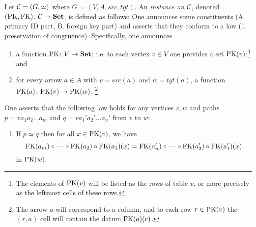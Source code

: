 \documentclass[CT4S-EN-RU]{subfiles}
\begin{document}
\begin{blockRUS}
\end{blockRUS}

\begin{definitionENG}\label{def:instance}
Let $\mathcal{C}=(G,\simeq)$ where $G=(V,A,src,tgt)$. An {\em instance on $\mathcal{C}$}, denoted $(\textnormal{PK},\textnormal{FK})\colon\mathcal{C}\rightarrow{\mathbf{Set}}$, is defined as follows: One announces some constituents (A. primary ID part, B. foreign key part) and asserts that they conform to a law (1. preservation of congruence). Specifically, one announces
\begin{enumerate}[\hsp A.]
\item a function $\textnormal{PK}\colon V\rightarrow {\mathbf{Set}}$; i.e. to each vertex $v\in V$ one provides a set $\textnormal{PK}(v)$;\footnote{The elements of $\textnormal{PK}(v)$ will be listed as the rows of table $v$, or more precisely as the leftmost cells of these rows.} and
\item for every arrow $a\in A$ with $v=src(a)$ and $w=tgt(a)$, a function $\textnormal{FK}(a)\colon\textnormal{PK}(v)\rightarrow\textnormal{PK}(w)$.
\footnote{The arrow $a$ will correspond to a column, and to each row $r\in\textnormal{PK}(v)$ the $(r,a)$ cell will contain the datum $\textnormal{FK}(a)(r)$.}
\end{enumerate}
One asserts that the following law holds for any vertices $v, w$ and paths $p=va_1a_2\ldots a_m$ and $q=va_1'a_2'\ldots a_n'$ from $v$ to $w$:
\begin{enumerate}[\hsp 1.]
\item If $p\simeq q$ then for all $x\in\textnormal{PK}(v)$, we have $$\textnormal{FK}(a_m)\circ\cdots\circ\textnormal{FK}(a_2)\circ\textnormal{FK}(a_1)(x)=\textnormal{FK}(a_n')\circ\cdots\circ\textnormal{FK}(a_2')\circ\textnormal{FK}(a_1')(x)$$ in $\textnormal{PK}(w).$
\end{enumerate}
\end{definitionENG}

\begin{definitionRUS}\label{def:instance}
\end{definitionRUS}
\end{document}
